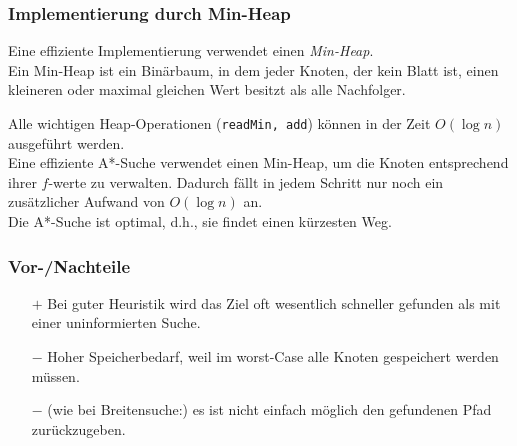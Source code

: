 \subsubsection{Implementierung durch Min-Heap}
Eine effiziente Implementierung verwendet einen \emph{Min-Heap}.\\
Ein Min-Heap ist ein Binärbaum, in dem jeder Knoten, der kein Blatt ist, einen kleineren oder maximal gleichen Wert besitzt als alle Nachfolger.
\begin{center}
\end{center}
Alle wichtigen Heap-Operationen (\lstinline`readMin, add`) können in der Zeit $O(\log n)$ ausgeführt werden.\\
Eine effiziente A*-Suche verwendet einen Min-Heap, um die Knoten entsprechend ihrer $f$-werte zu verwalten. Dadurch fällt in jedem Schritt nur noch ein zusätzlicher Aufwand von $O(\log n)$ an.\bigskip\\
Die A*-Suche ist optimal, d.h., sie findet einen kürzesten Weg.

\subsubsection{Vor-/Nachteile}
\begin{itemize}
\item[$+$] Bei guter Heuristik wird das Ziel oft wesentlich schneller gefunden als mit einer uninformierten Suche.
\item[$-$] Hoher Speicherbedarf, weil im worst-Case alle Knoten gespeichert werden müssen.
\item[$-$] (wie bei Breitensuche:) es ist nicht einfach möglich den gefundenen Pfad zurückzugeben. 
\end{itemize}
















